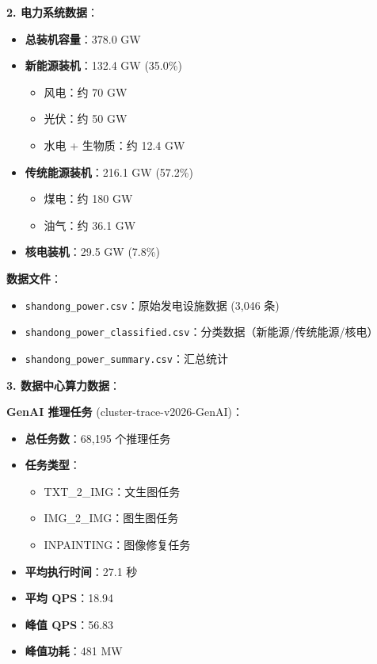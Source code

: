 \documentclass[12pt,a4paper]{article}
\begin{document}
\textbf{2. 电力系统数据}：

\begin{itemize}
    \item \textbf{总装机容量}：378.0 GW
    \item \textbf{新能源装机}：132.4 GW (35.0\%)
    \begin{itemize}
        \item 风电：约 70 GW
        \item 光伏：约 50 GW
        \item 水电 + 生物质：约 12.4 GW
    \end{itemize}
    \item \textbf{传统能源装机}：216.1 GW (57.2\%)
    \begin{itemize}
        \item 煤电：约 180 GW
        \item 油气：约 36.1 GW
    \end{itemize}
    \item \textbf{核电装机}：29.5 GW (7.8\%)
\end{itemize}

\textbf{数据文件}：
\begin{itemize}
    \item \texttt{shandong\_power.csv}：原始发电设施数据 (3,046 条)
    \item \texttt{shandong\_power\_classified.csv}：分类数据（新能源/传统能源/核电）
    \item \texttt{shandong\_power\_summary.csv}：汇总统计
\end{itemize}

\textbf{3. 数据中心算力数据}：

\textbf{GenAI 推理任务} (cluster-trace-v2026-GenAI)：
\begin{itemize}
    \item \textbf{总任务数}：68,195 个推理任务
    \item \textbf{任务类型}：
    \begin{itemize}
        \item TXT\_2\_IMG：文生图任务
        \item IMG\_2\_IMG：图生图任务
        \item INPAINTING：图像修复任务
    \end{itemize}
    \item \textbf{平均执行时间}：27.1 秒
    \item \textbf{平均 QPS}：18.94
    \item \textbf{峰值 QPS}：56.83
    \item \textbf{峰值功耗}：481 MW
\end{itemize}
\end{document}
